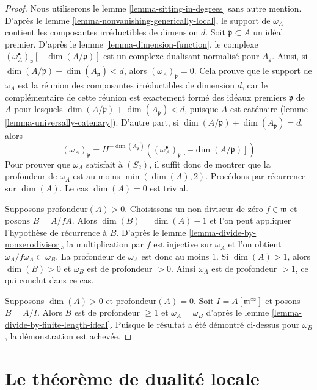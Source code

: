 \begin{proof}
Nous utiliserons le lemme \ref{lemma-sitting-in-degrees} sans autre mention.
D'après le lemme \ref{lemma-nonvanishing-generically-local}, le support de $\omega_A$ contient les composantes
irréductibles de dimension $d$. Soit $\mathfrak p \subset A$ un idéal premier.
D'après le lemme \ref{lemma-dimension-function}, le complexe $(\omega_A^\bullet)_{\mathfrak p}[-\dim(A/\mathfrak p)]$ est un complexe dualisant
normalisé pour $A_\mathfrak p$. Ainsi, si $\dim(A/\mathfrak p) + \dim(A_\mathfrak p) < d$, alors $(\omega_A)_\mathfrak p = 0$.
Cela prouve que le support de $\omega_A$ est la réunion des composantes
irréductibles de dimension $d$, car le complémentaire de cette réunion
est exactement formé des idéaux premiers $\mathfrak p$ de $A$ pour lesquels
$\dim(A/\mathfrak p) + \dim(A_\mathfrak p) < d$, puisque $A$ est caténaire (lemme \ref{lemma-universally-catenary}).
D'autre part, si $\dim(A/\mathfrak p) + \dim(A_\mathfrak p) = d$, alors
$$
(\omega_A)_\mathfrak p =
H^{-\dim(A_\mathfrak p)}\left(
(\omega_A^\bullet)_{\mathfrak p}[-\dim(A/\mathfrak p)] \right)
$$
Pour prouver que $\omega_A$ satisfait à $(S_2)$, il suffit donc de montrer
que la profondeur de $\omega_A$ est au moins $\min(\dim(A), 2)$.
Procédons par récurrence sur $\dim(A)$. Le cas $\dim(A) = 0$ est trivial.

\medskip\noindent
Supposons $\text{profondeur}(A) > 0$. Choisissons un non-diviseur de zéro $f \in \mathfrak m$
et posons $B = A/fA$. Alors $\dim(B) = \dim(A) - 1$ et l'on peut appliquer
l'hypothèse de récurrence à $B$.
D'après le lemme \ref{lemma-divide-by-nonzerodivisor}, la multiplication par $f$ est injective sur $\omega_A$
et l'on obtient $\omega_A/f\omega_A \subset \omega_B$. La profondeur de $\omega_A$ est donc au moins $1$.
Si $\dim(A) > 1$, alors $\dim(B) > 0$ et $\omega_B$ est de profondeur $ > 0$.
Ainsi $\omega_A$ est de profondeur $> 1$, ce qui conclut dans ce cas.

\medskip\noindent
Supposons $\dim(A) > 0$ et $\text{profondeur}(A) = 0$. Soit $I = A[\mathfrak m^\infty]$ et posons $B = A/I$.
Alors $B$ est de profondeur $\geq 1$ et $\omega_A = \omega_B$ d'après le lemme \ref{lemma-divide-by-finite-length-ideal}.
Puisque le résultat a été démontré ci-dessus pour $\omega_B$,
la démonstration est achevée.
\end{proof}





\section{Le théorème de dualité locale}
\label{section-local-duality}

